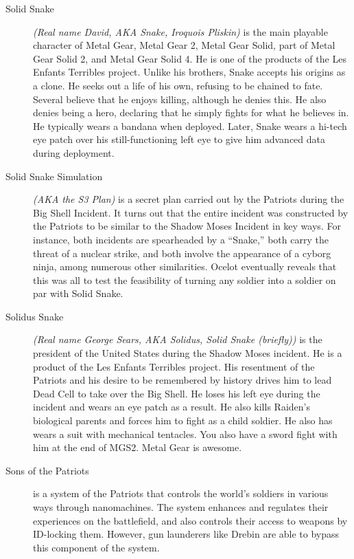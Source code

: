 \documentclass[12pt]{article}
\begin{document}
\begin{description}
	\item [Solid Snake] \textit{(Real name David, AKA Snake, Iroquois
		Pliskin)} is the main playable character of Metal Gear, Metal
		Gear 2, Metal Gear Solid, part of Metal Gear Solid 2, and Metal
		Gear Solid 4. He is one of the products of the Les Enfants
		Terribles project. Unlike his brothers, Snake accepts his
		origins as a clone. He seeks out a life of his own, refusing to
		be chained to fate. Several believe that he enjoys killing,
		although he denies this. He also denies being a hero, declaring
		that he simply fights for what he believes in. He typically
		wears a bandana when deployed. Later, Snake wears a hi-tech eye
		patch over his still-functioning left eye to give him advanced
		data during deployment.

	\item [Solid Snake Simulation] \textit{(AKA the S3 Plan)} is a secret
		plan carried out by the Patriots during the Big Shell Incident.
		It turns out that the entire incident was constructed by the
		Patriots to be similar to the Shadow Moses Incident in key
		ways. For instance, both incidents are spearheaded by a
		``Snake,'' both carry the threat of a nuclear strike, and both
		involve the appearance of a cyborg ninja, among numerous other
		similarities. Ocelot eventually reveals that this was all to
		test the feasibility of turning any soldier into a soldier on
		par with Solid Snake.

	\item [Solidus Snake] \textit{(Real name George Sears, AKA Solidus,
		Solid Snake (briefly))} is the president of the United States
		during the Shadow Moses incident. He is a product of the Les
		Enfants Terribles project. His resentment of the Patriots and
		his desire to be remembered by history drives him to lead Dead
		Cell to take over the Big Shell. He loses his left eye during
		the incident and wears an eye patch as a result. He also kills
		Raiden's biological parents and forces him to fight as a child
		soldier. He also has wears a suit with mechanical tentacles.
		You also have a sword fight with him at the end of MGS2. Metal
		Gear is awesome.

	\item [Sons of the Patriots] is a system of the Patriots that controls
		the world's soldiers in various ways through nanomachines. The
		system enhances and regulates their experiences on the
		battlefield, and also controls their access to weapons by
		ID-locking them. However, gun launderers like Drebin are able
		to bypass this component of the system.
	

\end{description}
\end{document}
